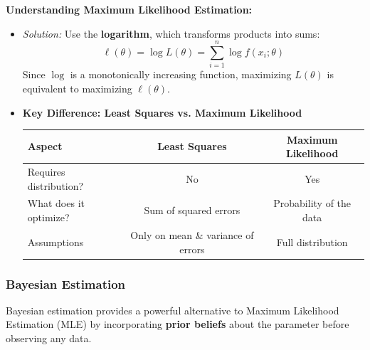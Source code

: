 \begin{example}{\textbf{Understanding Maximum Likelihood Estimation:}}
\begin{itemize}
\item  \textit{Solution:} Use the \textbf{logarithm}, which transforms products into sums:
\[
\ell(\theta) = \log L(\theta) = \sum_{i=1}^{n} \log f(x_i; \theta)
\]
Since $\log$ is a monotonically increasing function, maximizing $L(\theta)$ is equivalent to maximizing $\ell(\theta)$.

\vspace{0.3cm}
\item \textbf{Key Difference: Least Squares vs. Maximum Likelihood}

\begin{center}
\begin{tabular}{|l|c|c|}
\hline
\textbf{Aspect} & \textbf{Least Squares} & \textbf{Maximum Likelihood} \\
\hline
Requires distribution? & No & Yes \\
\hline
What does it optimize? & Sum of squared errors & Probability of the data \\
\hline
Assumptions & Only on mean \& variance of errors & Full distribution \\
\hline
\end{tabular}
\end{center}
\end{itemize}

\end{example}


\subsubsection{Bayesian Estimation}

Bayesian estimation provides a powerful alternative to Maximum Likelihood Estimation (MLE) by incorporating \textbf{prior beliefs} about the parameter before observing any data.

